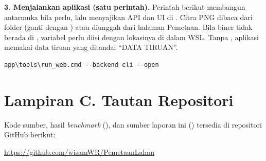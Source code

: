 \par\noindent\begin{minipage}{\linewidth}
\setlength{\parindent}{1.25cm}\setlength{\parskip}{6pt}\indent
\textbf{3. Menjalankan aplikasi (satu perintah).} Perintah berikut membangun antarmuka bila perlu, lalu menyajikan API dan UI di . Citra PNG dibaca dari folder  (ganti dengan ) atau diunggah dari halaman Pemetaan. Bila biner  tidak berada di , variabel  perlu diisi dengan lokasinya di dalam WSL. Tanpa , aplikasi memakai data tiruan yang ditandai ``DATA TIRUAN''.
\begin{lstlisting}[style=perintah]
app\tools\run_web.cmd --backend cli --open
\end{lstlisting}
\end{minipage}

\section*{Lampiran C. Tautan Repositori}
Kode sumber, hasil \emph{benchmark} (), dan sumber laporan ini () tersedia di repositori GitHub berikut:

\url{https://github.com/wisamWR/PemetaanLahan}
